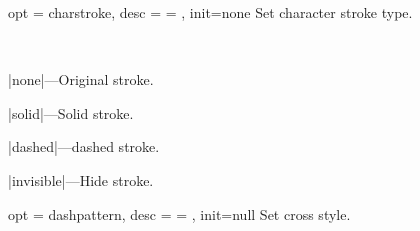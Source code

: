 \documentclass[full]{l3doc}
\begin{document}
\begin{documentation}
\bigskip

\begin{option}{ opt = charstroke, desc = {= }, init=none }
  Set character stroke type.
\end{option}\\
\begin{Description}
  \item |none|---Original stroke.
  \item |solid|---Solid stroke.
  \item |dashed|---dashed stroke.
  \item |invisible|---Hide stroke.
\end{Description}
\begin{SideBySideExample}[frame=single,numbers=left,xrightmargin=.45\linewidth,gobble=2]
  \centering
  \quad
  \quad
  \quad
\end{SideBySideExample}

\bigskip

\begin{option}{ opt = dashpattern, desc = {= }, init=null }
  Set cross style.
\end{option}\\
\begin{SideBySideExample}[frame=single,numbers=left,xrightmargin=.25\linewidth,gobble=2]
  \centering
  \quad
\end{SideBySideExample}

\end{documentation}
\end{document}
